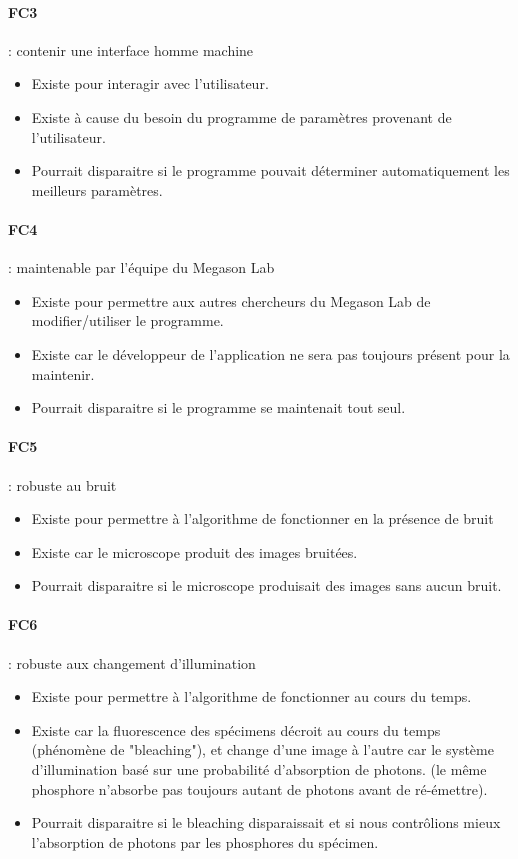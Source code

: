 \paragraph*{FC3} : contenir une interface homme machine
\begin{itemize}
  \item Existe pour interagir avec l'utilisateur.
  \item Existe à cause du besoin du programme de paramètres provenant de l'utilisateur.
  \item Pourrait disparaitre si le programme pouvait déterminer automatiquement les meilleurs paramètres.
\end{itemize}

\paragraph*{FC4} : maintenable par l'équipe du Megason Lab
\begin{itemize}
  \item Existe pour permettre aux autres chercheurs du Megason Lab de modifier/utiliser le programme.
  \item Existe car le développeur de l'application ne sera pas toujours présent pour la maintenir.
  \item Pourrait disparaitre si le programme se maintenait tout seul.
\end{itemize}

\paragraph*{FC5} : robuste au bruit
\begin{itemize}
  \item Existe pour permettre à l'algorithme de fonctionner en la présence de bruit
  \item Existe car le microscope produit des images bruitées.
  \item Pourrait disparaitre si le microscope produisait des images sans aucun bruit.
\end{itemize}


\paragraph*{FC6} : robuste aux changement d'illumination
\begin{itemize}
  \item Existe pour permettre à l'algorithme de fonctionner au cours du temps. 
  \item Existe car la fluorescence des spécimens décroit au cours du temps (phénomène de "bleaching"),
  et change d'une image à l'autre car le système d'illumination basé sur une probabilité d'absorption de photons.
  (le même phosphore n'absorbe pas toujours autant de photons avant de ré-émettre).
  \item Pourrait disparaitre si le bleaching disparaissait 
  et si nous contrôlions mieux l'absorption de photons par les phosphores du spécimen.
\end{itemize}

